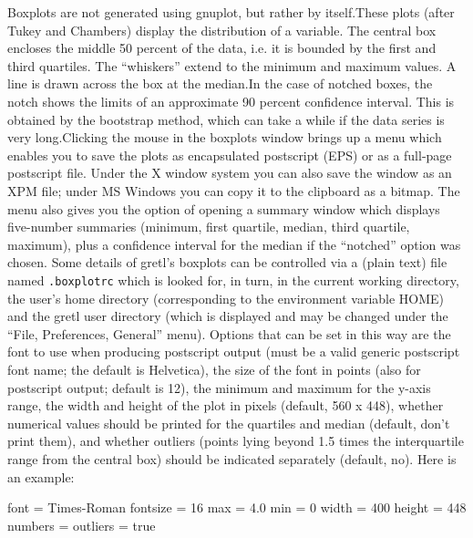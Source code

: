 Boxplots are not generated using gnuplot, but rather by 
itself.These plots (after Tukey and Chambers) display the distribution
of a variable. The central box encloses the middle 50 percent of the
data, i.e. it is bounded by the first and third quartiles.  The
``whiskers'' extend to the minimum and maximum values.  A line is
drawn across the box at the median.In the case of notched boxes, the
notch shows the limits of an approximate 90 percent confidence
interval.  This is obtained by the bootstrap method, which can take a
while if the data series is very long.Clicking the mouse in the
boxplots window brings up a menu which enables you to save the plots
as encapsulated postscript (EPS) or as a full-page postscript file.
Under the X window system you can also save the window as an XPM file;
under MS Windows you can copy it to the clipboard as a bitmap.  The
menu also gives you the option of opening a summary window which
displays five-number summaries (minimum, first quartile, median, third
quartile, maximum), plus a confidence interval for the median if the
``notched'' option was chosen.  Some details of gretl's boxplots can
be controlled via a (plain text) file named \verb+.boxplotrc+ which is
looked for, in turn, in the current working directory, the user's home
directory (corresponding to the environment variable HOME) and the
gretl user directory (which is displayed and may be changed under the
``File, Preferences, General'' menu).  Options that can be set in this
way are the font to use when producing postscript output (must be a
valid generic postscript font name; the default is Helvetica), the
size of the font in points (also for postscript output; default is
12), the minimum and maximum for the y-axis range, the width and
height of the plot in pixels (default, 560 x 448), whether numerical
values should be printed for the quartiles and median (default, don't
print them), and whether outliers (points lying beyond 1.5 times the
interquartile range from the central box) should be indicated
separately (default, no).  Here is an example:

\begin{code}
font = Times-Roman
fontsize = 16
max = 4.0
min = 0
width = 400
height = 448
numbers = %
outliers = true
\end{code}

